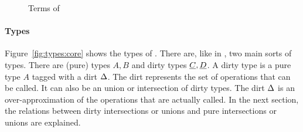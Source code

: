 \begin{figure}[H]
\begin{center}
\end{center}
\caption{Terms of \core}\label{fig:terms:core}
\end{figure}

\paragraph{Types}
Figure~\ref{fig:types:core} shows the types of \core. There are, like in \eff, two main sorts of types. There are (pure) types $A, B$ and dirty types $\underline{C}, \underline{D}$. A dirty type is a pure type $A$ tagged with a dirt $\Delta$. The dirt represents the set of operations that can be called. It can also be an union or intersection of dirty types. The dirt $\Delta$ is an over-approximation of the operations that are actually called. In the next section, the relations between dirty intersections or unions and pure intersections or unions are explained.


